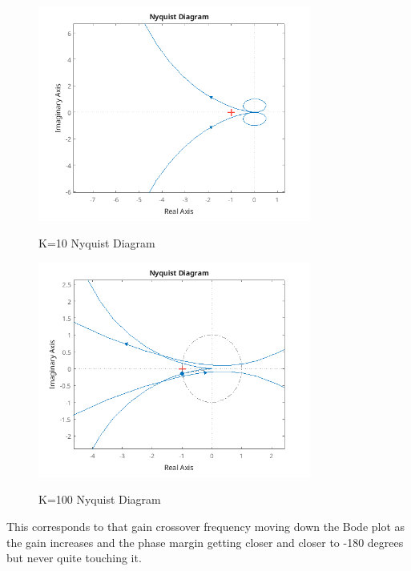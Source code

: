 \documentclass{article}
\begin{document}
\begin{figure}[H]
    \centering
    \includegraphics[width=0.8\textwidth]{k10nyquistDiagram.png}
    \label{fig:k10nyquistDiagram}
    \caption{K=10 Nyquist Diagram}
\end{figure}

\begin{figure}[H]
    \centering
    \includegraphics[width=0.8\textwidth]{k100nyquistDiagram.png}
    \label{fig:k100nyquistDiagram}
    \caption{K=100 Nyquist Diagram}
\end{figure}

This corresponds to that gain crossover frequency moving down the Bode plot as the gain increases and the phase margin getting closer and closer to -180 degrees but never quite touching it.
\end{document}
